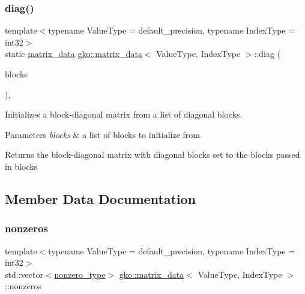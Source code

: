 \subsubsection{\texorpdfstring{diag()}{diag()}\hspace{0.1cm}{\footnotesize\ttfamily [5/5]}}
{\footnotesize\ttfamily template$<$typename Value\+Type = default\+\_\+precision, typename Index\+Type = int32$>$ \\
static \hyperlink{structgko_1_1matrix__data}{matrix\+\_\+data} \hyperlink{structgko_1_1matrix__data}{gko\+::matrix\+\_\+data}$<$ Value\+Type, Index\+Type $>$\+::diag (\begin{DoxyParamCaption}\item[{std\+::initializer\+\_\+list$<$ \hyperlink{structgko_1_1matrix__data}{matrix\+\_\+data}$<$ Value\+Type, Index\+Type $>$ $>$}]{blocks }\end{DoxyParamCaption})\hspace{0.3cm}{\ttfamily [inline]}, {\ttfamily [static]}}



Initializes a block-\/diagonal matrix from a list of diagonal blocks. 


\begin{DoxyParams}{Parameters}
{\em blocks} & a list of blocks to initialize from\\
\hline
\end{DoxyParams}
\begin{DoxyReturn}{Returns}
the block-\/diagonal matrix with diagonal blocks set to the blocks passed in blocks 
\end{DoxyReturn}


\subsection{Member Data Documentation}
\mbox{\label{structgko_1_1matrix__data_a4f6be92270fa96bccdc502c83d248dc0}} 
\subsubsection{\texorpdfstring{nonzeros}{nonzeros}}
{\footnotesize\ttfamily template$<$typename Value\+Type = default\+\_\+precision, typename Index\+Type = int32$>$ \\
std\+::vector$<$\hyperlink{structgko_1_1matrix__data_1_1nonzero__type}{nonzero\+\_\+type}$>$ \hyperlink{structgko_1_1matrix__data}{gko\+::matrix\+\_\+data}$<$ Value\+Type, Index\+Type $>$\+::nonzeros}



